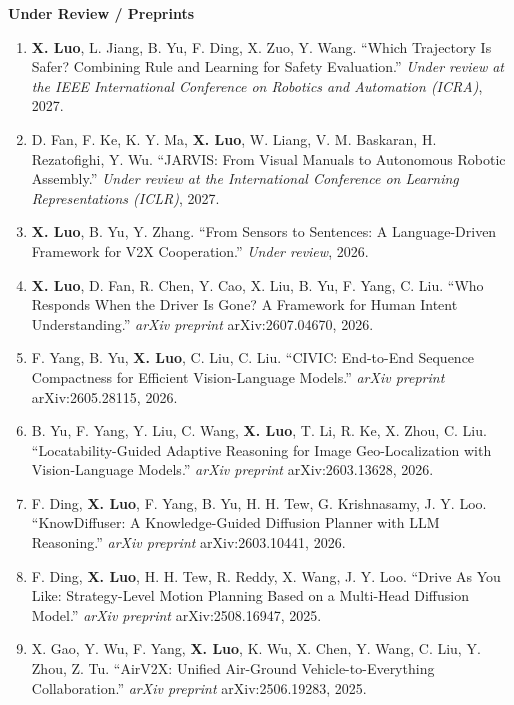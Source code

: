 \documentclass[letterpaper,11pt]{article}
\begin{document}
\vspace{6pt}
\normalsize{\textbf{Under Review / Preprints}}
\vspace{10pt}
\small
\begin{justifying}
\begin{enumerate}

\item \textbf{X. Luo}, L. Jiang, B. Yu, F. Ding, X. Zuo, Y. Wang. “Which Trajectory Is Safer? Combining Rule and Learning for Safety Evaluation.” \textit{Under review at the IEEE International Conference on Robotics and Automation (ICRA)}, 2027.

\item D. Fan, F. Ke, K. Y. Ma, \textbf{X. Luo}, W. Liang, V. M. Baskaran, H. Rezatofighi, Y. Wu. “JARVIS: From Visual Manuals to Autonomous Robotic Assembly.” \textit{Under review at the International Conference on Learning Representations (ICLR)}, 2027.

\item \textbf{X. Luo}, B. Yu, Y. Zhang. “From Sensors to Sentences: A Language-Driven Framework for V2X Cooperation.” \textit{Under review}, 2026.

\item \textbf{X. Luo}, D. Fan, R. Chen, Y. Cao, X. Liu, B. Yu, F. Yang, C. Liu. “Who Responds When the Driver Is Gone? A Framework for Human Intent Understanding.” \textit{arXiv preprint} arXiv:2607.04670, 2026.

\item F. Yang, B. Yu, \textbf{X. Luo}, C. Liu, C. Liu. “CIVIC: End-to-End Sequence Compactness for Efficient Vision-Language Models.” \textit{arXiv preprint} arXiv:2605.28115, 2026.

\item B. Yu, F. Yang, Y. Liu, C. Wang, \textbf{X. Luo}, T. Li, R. Ke, X. Zhou, C. Liu. “Locatability-Guided Adaptive Reasoning for Image Geo-Localization with Vision-Language Models.” \textit{arXiv preprint} arXiv:2603.13628, 2026.

\item F. Ding, \textbf{X. Luo}, F. Yang, B. Yu, H. H. Tew, G. Krishnasamy, J. Y. Loo. “KnowDiffuser: A Knowledge-Guided Diffusion Planner with LLM Reasoning.” \textit{arXiv preprint} arXiv:2603.10441, 2026.

\item F. Ding, \textbf{X. Luo}, H. H. Tew, R. Reddy, X. Wang, J. Y. Loo. “Drive As You Like: Strategy-Level Motion Planning Based on a Multi-Head Diffusion Model.” \textit{arXiv preprint} arXiv:2508.16947, 2025.

\item X. Gao, Y. Wu, F. Yang, \textbf{X. Luo}, K. Wu, X. Chen, Y. Wang, C. Liu, Y. Zhou, Z. Tu. “AirV2X: Unified Air-Ground Vehicle-to-Everything Collaboration.” \textit{arXiv preprint} arXiv:2506.19283, 2025.

\end{enumerate}
\end{justifying}
\end{document}
